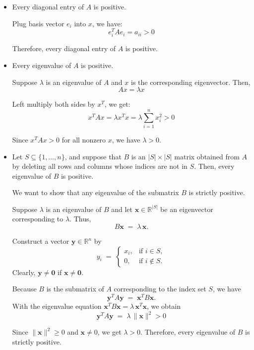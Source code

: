 \documentclass{article}
\begin{document}
\begin{itemize}
    \item Every diagonal entry of $A$ is positive.
    
    Plug basis vector $e_i$ into $x$, we have:
    \[
    e_i^T A e_i = a_{ii} > 0
    \]

    Therefore, every diagonal entry of $A$ is positive.

    \item Every eigenvalue of $A$ is positive.

    Suppose $\lambda$ is an eigenvalue of $A$ and $x$ is the corresponding eigenvector. Then,
    \[
    Ax = \lambda x
    \]

    Left multiply both sides by $x^T$, we get:
    \[
    x^T A x = \lambda x^T x = \lambda \sum_{i=1}^n x_i^2 > 0
    \]

    Since $x^T A x > 0$ for all nonzero $x$, we have $\lambda > 0$.

    \item Let $S \subseteq \{1,\ldots,n\}$, and suppose that $B$ is an $|S| \times |S|$ matrix obtained from $A$ by deleting all rows and columns whose indices are not in $S$. Then, every eigenvalue of $B$ is positive.

We want to show that any eigenvalue of the submatrix \(B\) is strictly positive.

Suppose \(\lambda\) is an eigenvalue of \(B\) and let \(\mathbf{x} \in \mathbb{R}^{|S|}\)
be an eigenvector corresponding to \(\lambda\). Thus,
\[
B \mathbf{x} \;=\; \lambda \, \mathbf{x}.
\]

Construct a vector \(\mathbf{y} \in \mathbb{R}^n\) by
\[
y_i \;=\;
\begin{cases}
x_i, & \text{if } i \in S, \\
0,   & \text{if } i \notin S.
\end{cases}
\]
Clearly, \(\mathbf{y} \neq \mathbf{0}\) if \(\mathbf{x} \neq \mathbf{0}\).

Because \(B\) is the submatrix of \(A\) corresponding to the index set \(S\),
we have
\[
\mathbf{y}^T A \mathbf{y}
\;=\;
\mathbf{x}^T B \mathbf{x}.
\]
With the eigenvalue equation \(\mathbf{x}^T B \mathbf{x} = \lambda \, \mathbf{x}^T \mathbf{x}\),
we obtain
\[
\mathbf{y}^T A \mathbf{y}
\;=\;
\lambda \, \|\mathbf{x}\|^2 > 0
\]

Since \(\|\mathbf{x}\|^2 \ge 0\) and \(\mathbf{x} \neq 0\), we get \(\lambda > 0\).
Therefore, every eigenvalue of \(B\) is strictly positive.

\end{itemize}
\end{document}
